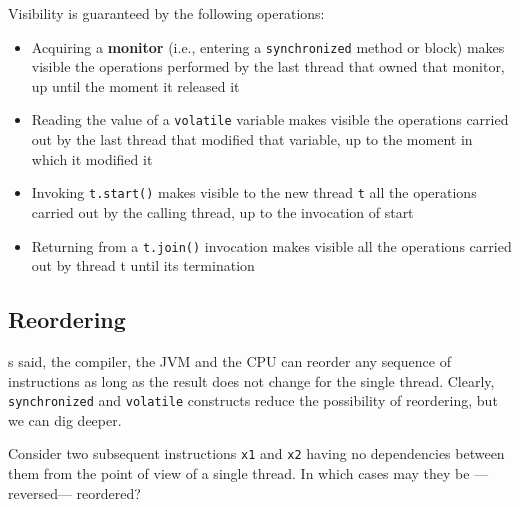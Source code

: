 {Visibility is guaranteed by the following operations:\ns
\begin{itemize}
   \item Acquiring a \textbf{monitor} (i.e., entering a \lstinline|synchronized| method or block) makes visible the operations performed by the last thread that owned that monitor, up until the moment it released it
   \item Reading the value of a \lstinline|volatile| variable makes visible the operations carried out by the last thread that modified that variable, up to the moment in which it modified it
   \item Invoking \lstinline|t.start()| makes visible to the new thread \lstinline|t| all the operations carried out by the calling thread, up to the invocation of start
   \item Returning from a \lstinline|t.join()| invocation makes visible all the operations carried out by thread t until its termination 
\end{itemize}
}

\subsection{Reordering}
s said, the compiler, the JVM and the CPU can reorder any
sequence of instructions as long as the result does not change for
the single thread.
Clearly, \lstinline|synchronized| and \lstinline|volatile| constructs reduce the possibility of reordering, but we can dig deeper.

Consider two subsequent instructions \lstinline|x1| and \lstinline|x2| having no dependencies between them from the point of view of a single thread.
In which cases may they be ---reversed--- reordered?

